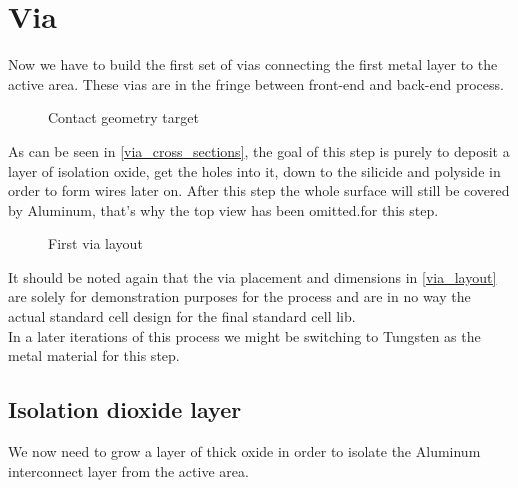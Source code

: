 \section{Via}\label{via}

Now we have to build the first set of vias connecting the first metal layer to the active area.
These vias are in the fringe between front-end and back-end process.

\begin{figure}[H]
	\centering
	\begin{tikzpicture}[node distance = 3cm, auto, thick,scale=\CrossSectionOnly, every node/.style={transform shape}]
		
	\end{tikzpicture}
	\caption{Contact geometry target}
	\label{via_cross_sections}
\end{figure}

As can be seen in \autoref{via_cross_sections}, the goal of this step is purely to deposit a layer of isolation oxide, get the holes into it, down to the silicide and polyside in order to form wires later on.
After this step the whole surface will still be covered by Aluminum, that's why the top view has been omitted.for this step.

\begin{figure}[H]
	\centering
	\begin{tikzpicture}[node distance =1cm, auto, thick,scale=\VLSILayout, every node/.style={transform shape}]
		
	\end{tikzpicture}
	\caption{First via layout}
	\label{via_layout}
\end{figure}

It should be noted again that the via placement and dimensions in \autoref{via_layout} are solely for demonstration purposes for the process and are in no way the actual standard cell design for the final standard cell lib. \\

In a later iterations of this process we might be switching to Tungsten as the metal material for this step.

\newpage

\subsection{Isolation dioxide layer}

We now need to grow a layer of thick oxide in order to isolate the Aluminum interconnect layer from the active area.

